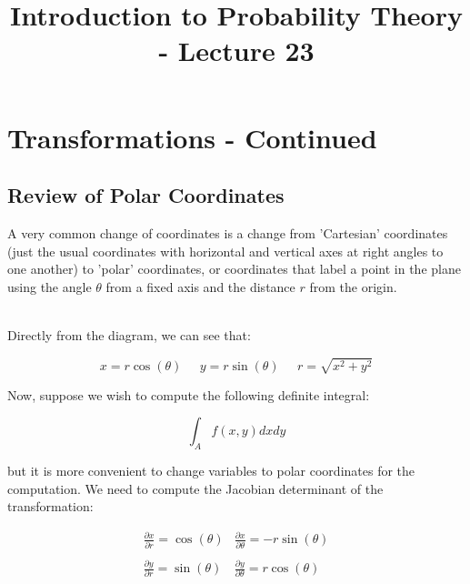\documentclass[12pt]{article} %
\date{}
\title{Introduction to Probability Theory - Lecture 23}
\begin{document}
\maketitle

\section{Transformations - Continued}
\subsection{Review of Polar Coordinates}
A very common change of coordinates is a change from 'Cartesian' coordinates (just the usual coordinates with horizontal and vertical axes at right angles to one another) to 'polar' coordinates, or coordinates that label a point in the plane using the angle $\theta$ from a fixed axis and the distance $r$ from the origin.\\\\


Directly from the diagram, we can see that:

$$x=r\cos(\theta)\;\;\;\;\; y=r\sin(\theta) \;\;\;\;\; r = \sqrt{x^2+y^2}$$

Now, suppose we wish to compute the following definite integral:

$$\int_A f(x,y) dx dy$$

but it is more convenient to change variables to polar coordinates for the computation. We need to compute the Jacobian determinant of the transformation:

$$\begin{matrix}
\frac{\partial x}{\partial r} = \cos(\theta) & \frac{\partial x}{\partial \theta} = -r\sin(\theta)\\\\\frac{\partial y}{\partial r} = \sin(\theta) & \frac{\partial y}{\partial \theta} = r\cos(\theta)
\end{matrix}$$
\end{document}
